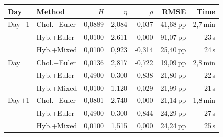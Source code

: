 \begin{tabular}{l l r r r r r}
  \toprule
  \textbf{Day} & \textbf{Method} & \textbf{$H$} & \textbf{$\eta$} & \textbf{$\rho$} & \textbf{RMSE} & \textbf{Time} \\
  \midrule
  Day$-$1 & Chol.+Euler & 0,0889 & 2,084 & -0,037 & 41,68\,pp & 2,7\,min \\
   & Hyb.+Euler & 0,0100 & 2,611 & 0,000 & 91,07\,pp & 23\,s \\
   & Hyb.+Mixed & 0,0100 & 0,923 & -0,314 & 25,40\,pp & 24\,s \\
  \addlinespace[3pt]
  Day & Chol.+Euler & 0,0136 & 2,817 & -0,722 & 19,09\,pp & 2,8\,min \\
   & Hyb.+Euler & 0,4900 & 0,300 & -0,838 & 21,80\,pp & 22\,s \\
   & Hyb.+Mixed & 0,0100 & 1,120 & -0,029 & 21,99\,pp & 21\,s \\
  \addlinespace[3pt]
  Day$+$1 & Chol.+Euler & 0,0801 & 2,740 & 0,000 & 21,14\,pp & 1,8\,min \\
   & Hyb.+Euler & 0,4900 & 0,300 & -0,844 & 24,29\,pp & 27\,s \\
   & Hyb.+Mixed & 0,0100 & 1,515 & 0,000 & 24,24\,pp & 25\,s \\
  \bottomrule
\end{tabular}